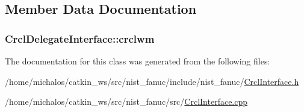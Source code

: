 \subsection{Member Data Documentation}
\hypertarget{classCrcl_1_1CrclDelegateInterface_a18d6ff1b51227f0424f2611804bed4bd}{
\subsubsection[{crclwm}]{ Crcl\-Delegate\-Interface\-::crclwm\hspace{0.3cm}{\ttfamily [static]}}}\label{classCrcl_1_1CrclDelegateInterface_a18d6ff1b51227f0424f2611804bed4bd}


The documentation for this class was generated from the following files\-:\begin{DoxyCompactItemize}
\item 
/home/michalos/catkin\-\_\-ws/src/nist\-\_\-fanuc/include/nist\-\_\-fanuc/\hyperlink{CrclInterface_8h}{Crcl\-Interface.\-h}\item 
/home/michalos/catkin\-\_\-ws/src/nist\-\_\-fanuc/src/\hyperlink{CrclInterface_8cpp}{Crcl\-Interface.\-cpp}\end{DoxyCompactItemize}
